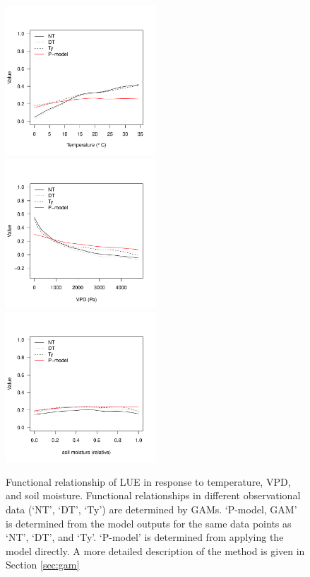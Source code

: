 \documentclass{myreport}
\begin{document}
\begin{figure}[!ht]
\includegraphics[width=0.5\textwidth]{fig/functionalrel_gam_temp.pdf}
\includegraphics[width=0.5\textwidth]{fig/functionalrel_gam_vpd.pdf}
\includegraphics[width=0.5\textwidth]{fig/functionalrel_gam_soilm.pdf}
    \caption{Functional relationship of LUE in response to temperature, VPD, and soil moisture. Functional relationships in different observational data (`NT', `DT', `Ty') are determined by GAMs. `P-model, GAM' is determined from the model outputs for the same data points as `NT', `DT', and `Ty'. `P-model' is determined from applying the model directly. A more detailed description of the method is given in Section \ref{sec:gam}}
    \label{fig:functionalrel}
\end{figure}
\end{document}
